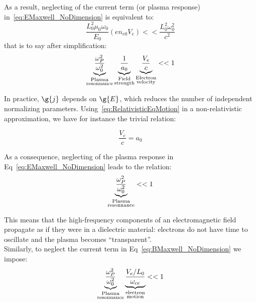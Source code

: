 \noindent  As a result, neglecting of the current term (or plasma response) in~\ref{eq:EMaxwell_NoDimension} is equivalent to:
$$
\frac{ L_0^2 \mu_0\omega_0}{E_0}(en_{e0}V_e) << \frac{L_0^2 \omega_0^2}{c^2}
$$
\noindent that is to say after simplification:
$$
\underbrace{\frac{\omega_P^2}{\omega_0^2}}_{\begin{subarray}{c}
\text{Plasma}\\
\text{resonnance}
\end{subarray}}
\underbrace{\frac{1}{a_0}}_{\begin{subarray}{c}
\text{Field}\\
\text{strength}
\end{subarray}}
\underbrace{\frac{V_e}{c}}_{\begin{subarray}{c}
\text{Electron}\\
\text{velocity}
\end{subarray}}<< 1
$$

\noindent In practice, $\g{j}$ depends on $\g{E}$, which reduces the number of independent normalizing parameters. Using~\ref{eq:RelativisticEqMotion} in a non-relativistic approximation, we have for instance the trivial relation:

$$
\frac{V_e}{c}= a_0
$$

\noindent As a consequence, neglecting of the plasma response in Eq~\ref{eq:EMaxwell_NoDimension} leads to the relation:
$$
\underbrace{\frac{\omega_P^2}{\omega_0^2}}_{\begin{subarray}{c}
\text{Plasma}\\
\text{resonnance}
\end{subarray}}
<< 1
$$

\noindent This means that the high-frequency components of an electromagnetic field propagate as if they were in a dielectric material: electrons do not have time to oscillate and the plasma becomes ``transparent''.\\

\noindent Similarly, to neglect the current term in Eq~\ref{eq:BMaxwell_NoDimension} we impose:
$$
\underbrace{\frac{\omega_P^2}{\omega_0^2}}_{\begin{subarray}{c}
\text{Plasma}\\
\text{resonnance}
\end{subarray}}
\underbrace{\frac{V_e/L_0}{\omega_{ce}}}_{\begin{subarray}{c}
\text{electron}\\
\text{motion}
\end{subarray}}
<< 1
$$

